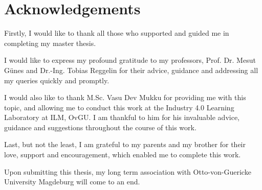 


\thispagestyle{plain}
\section*{Acknowledgements}
\begin{spacing}{1.25}
Firstly, I would like to thank all those who supported and guided me in completing my master thesis.

I would like to express my profound gratitude
to my professors, Prof. Dr. Mesut Günes and Dr.-Ing. Tobias Reggelin for their advice, guidance and addressing all my queries quickly and promptly.

I would also like to thank M.Sc. Vasu Dev Mukku for providing me with this
topic, and allowing me to conduct this work at the Industry 4.0 Learning Laboratory at ILM, OvGU. I am thankful to him for his invaluable advice, guidance and suggestions throughout the course of
this work.

Last, but not the least, I am grateful to my parents and
my brother for their love, support and encouragement, which enabled me to complete
this work.

Upon submitting this thesis, my long term association with Otto-von-Guericke
University Magdeburg will come to an end.
\end{spacing}

\cleardoublepage

\setcounter{tocdepth}{2}
\tableofcontents
